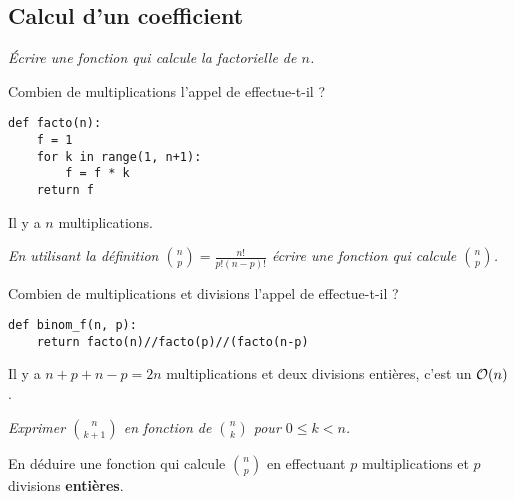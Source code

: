 \subsection{Calcul d'un coefficient} 
\begin{Exercise}
\it Écrire une fonction  qui calcule la factorielle de $n$.

Combien de multiplications l'appel de  effectue-t-il ?
\end{Exercise}
\begin{Answer}
\begin{lstlisting}
def facto(n):
    f = 1
    for k in range(1, n+1):
        f = f * k
    return f
\end{lstlisting}
Il y a $n$ multiplications.
\end{Answer}
\begin{Exercise}
\it En utilisant la définition $\displaystyle \binom np = \frac{n!}{p!(n-p)!}$ écrire une fonction  qui calcule $\displaystyle \binom np$.

Combien de multiplications et divisions l'appel de  effectue-t-il ?
\end{Exercise}
\begin{Answer}
\begin{lstlisting}
def binom_f(n, p):
    return facto(n)//facto(p)//(facto(n-p)
\end{lstlisting}
Il y a $n +p + n - p = 2n$ multiplications et deux divisions entières, c'est un ${\cal O}(n)$.
\end{Answer}
\begin{Exercise}[label = exo:prod]
\it Exprimer $\displaystyle \binom n{k+1}$ en fonction de  $\displaystyle \binom nk$ pour $0\le k < n$.

En déduire une fonction  qui calcule $\displaystyle \binom np$ en effectuant $p$ multiplications et $p$ divisions {\bf entières}.
\end{Exercise}
